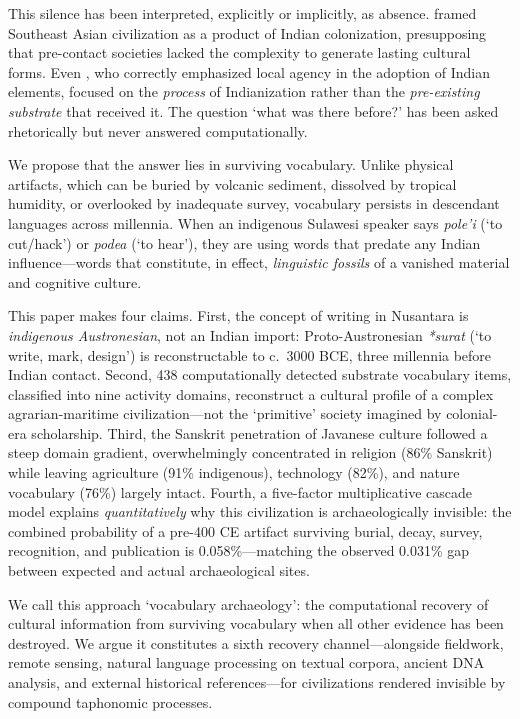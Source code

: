 \documentclass[12pt,a4paper]{article}
\begin{document}
This silence has been interpreted, explicitly or implicitly, as absence. \citet{coedes1968} framed Southeast Asian civilization as a product of Indian colonization, presupposing that pre-contact societies lacked the complexity to generate lasting cultural forms. Even \citet{wolters1999}, who correctly emphasized local agency in the adoption of Indian elements, focused on the \textit{process} of Indianization rather than the \textit{pre-existing substrate} that received it. The question `what was there before?' has been asked rhetorically but never answered computationally.

We propose that the answer lies in surviving vocabulary. Unlike physical artifacts, which can be buried by volcanic sediment, dissolved by tropical humidity, or overlooked by inadequate survey, vocabulary persists in descendant languages across millennia. When an indigenous Sulawesi speaker says \textit{pole'i} (`to cut/hack') or \textit{podea} (`to hear'), they are using words that predate any Indian influence---words that constitute, in effect, \textit{linguistic fossils} of a vanished material and cognitive culture.

This paper makes four claims. First, the concept of writing in Nusantara is \textit{indigenous Austronesian}, not an Indian import: Proto-Austronesian \textit{*surat} (`to write, mark, design') is reconstructable to c.\ 3000 BCE, three millennia before Indian contact. Second, 438 computationally detected substrate vocabulary items, classified into nine activity domains, reconstruct a cultural profile of a complex agrarian-maritime civilization---not the `primitive' society imagined by colonial-era scholarship. Third, the Sanskrit penetration of Javanese culture followed a steep domain gradient, overwhelmingly concentrated in religion (86\% Sanskrit) while leaving agriculture (91\% indigenous), technology (82\%), and nature vocabulary (76\%) largely intact. Fourth, a five-factor multiplicative cascade model explains \textit{quantitatively} why this civilization is archaeologically invisible: the combined probability of a pre-400 CE artifact surviving burial, decay, survey, recognition, and publication is 0.058\%---matching the observed 0.031\% gap between expected and actual archaeological sites.

We call this approach `vocabulary archaeology': the computational recovery of cultural information from surviving vocabulary when all other evidence has been destroyed. We argue it constitutes a sixth recovery channel---alongside fieldwork, remote sensing, natural language processing on textual corpora, ancient DNA analysis, and external historical references---for civilizations rendered invisible by compound taphonomic processes.
\end{document}
